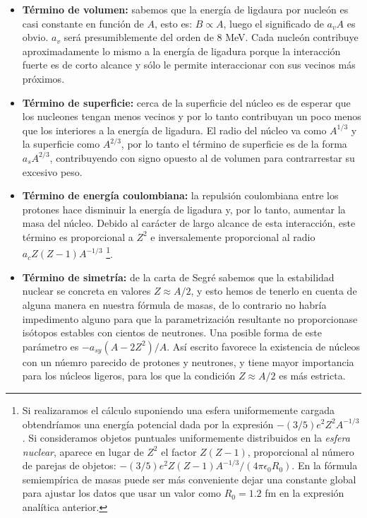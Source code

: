 \begin{itemize}
	\item \textbf{Término de volumen:} sabemos que la energía de ligdaura por nucleón es casi constante en función de $A$, esto es: $B\propto A$, luego el significado de $a_v A$ es obvio. $a_v$ será presumiblemente del orden de 8 MeV. Cada nucleón contribuye aproximadamente lo mismo a la energía de ligadura porque la interacción fuerte es de corto alcance y sólo le permite interaccionar con sus vecinos más próximos.
	\item \textbf{Término de superficie:} cerca de la superficie del núcleo es de esperar que los nucleones tengan menos vecinos y por lo tanto contribuyan un poco menos que los interiores a la energía de ligadura. El radio del núcleo va como $A^{1/3}$ y la superficie como $A^{2/3}$, por lo tanto el término de superficie es de la forma $a_s A^{2/3}$, contribuyendo con signo opuesto al de volumen para contrarrestar su excesivo peso.
	\item \textbf{Término de energía coulombiana:} la repulsión coulombiana entre los protones hace disminuir la energía de ligadura y, por lo tanto, aumentar la masa del núcleo. Debido al carácter de largo alcance de esta interacción, este término es proporcional a $Z^2$ e inversalemente proporcional al radio $a_c Z(Z-1)A^{-1/3}$ \footnote{Si realizaramos el cálculo suponiendo una esfera uniformemente cargada obtendríamos  una energía potencial dada por la expresión $-(3/5)e^2 Z^2 A^{-1/3}$. Si consideramos objetos puntuales uniformemente distribuidos en la \textit{esfera nuclear}, aparece en lugar de $Z^2$ el factor $Z(Z-1)$, proporcional al número de parejas de objetos: $-(3/5)e^2Z(Z-1)A^{-1/3} / (4\pi \epsilon_0 R_0)$. En la fórmula semiempírica de masas puede ser más conveniente dejar una constante global para ajustar los datos que usar un valor como $R_0=1.2$ fm en la expresión analítica anterior.}.
	\item \textbf{Término de simetría:} de la carta de Segré sabemos que la estabilidad nuclear se concreta en valores $Z\approx A/2$, y esto hemos de tenerlo en cuenta de alguna manera en nuestra fórmula de masas, de lo contrario no habría impedimento alguno para que la parametrización resultante no proporcionase isótopos estables con cientos de neutrones. Una posible forma de este parámetro es $-a_{sy} (A-2Z^2)/A$. Así escrito favorece la existencia de núcleos con un núemro parecido de protones y neutrones, y tiene mayor importancia para los núcleos ligeros, para los que la condición $Z\approx A/2$ es más estricta.

\end{itemize}
